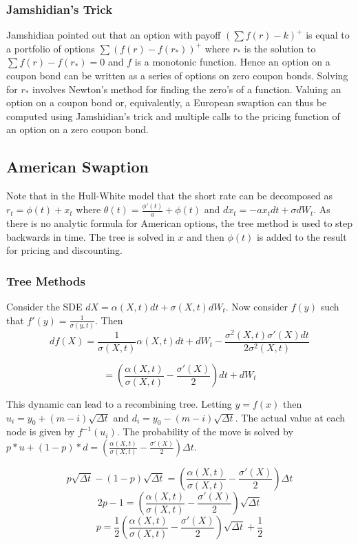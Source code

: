 \documentclass{article}
\theoremstyle{definition}
\begin{document}
\subsubsection{Jamshidian's Trick} \label{Jamshidian}

Jamshidian pointed out that an option with payoff \(\left(\sum f(r) -k\right)^+\) is equal to a portfolio of options \(\sum (f(r)-f(r_*))^+\) where \(r_*\) is the solution to \(\sum f(r)-f(r_*)=0\) and \(f\) is a monotonic function. Hence an option on a coupon bond can be written as a series of options on zero coupon bonds.   Solving for \(r_*\) involves Newton's method for finding the zero's of a function.  Valuing an option on a coupon bond or, equivalently, a European swaption can thus be computed using Jamshidian's trick and multiple calls to the pricing function of an option on a zero coupon bond.

\subsection{American Swaption}

Note that in the Hull-White model that the short rate can be decomposed as \(r_t=\phi(t)+x_t\) where \(\theta(t)=\frac{\phi'(t)}{a}+\phi(t)\) and \(dx_t=-ax_t dt+\sigma dW_t\).  As there is no analytic formula for American options, the tree method is used to step backwards in time.  The tree is solved in \(x\) and then \(\phi(t)\) is added to the result for pricing and discounting.

\subsubsection{Tree Methods} \label{tree}
Consider the SDE \(dX=\alpha(X, t)dt+\sigma(X, t)dW_t\).  Now consider \(f(y)\) such that \(f'(y)=\frac{1}{\sigma(y, t)}\).  Then \[df(X)=\frac{1}{\sigma(X, t)} \alpha(X, t)dt+dW_t-\frac{\sigma^2(X, t)\sigma'(X)dt}{2\sigma^2(X, t)}\]

\[=\left(\frac{\alpha(X, t)}{\sigma(X, t)}-\frac{\sigma'(X)}{2}\right)dt+dW_t\]

 This dynamic can lead to a recombining tree.  Letting \(y=f(x)\) then \(u_i=y_0+(m-i)\sqrt{\Delta t}\) and \(d_i=y_0-(m-i)\sqrt{\Delta t}\).  The actual value at each node is given by \(f^{-1}(u_i)\). The probability of the move is solved by \(p*u+(1-p)*d=\left(\frac{\alpha(X, t)}{\sigma(X, t)}-\frac{\sigma'(X)}{2}\right)\Delta t\).

 \[p\sqrt{\Delta t}-(1-p)\sqrt{\Delta t}=\left(\frac{\alpha(X, t)}{\sigma(X, t)}-\frac{\sigma'(X)}{2}\right)\Delta t\]
  \[2p-1=\left(\frac{\alpha(X, t)}{\sigma(X, t)}-\frac{\sigma'(X)}{2}\right)\sqrt{\Delta t}\]
  \[p=\frac{1}{2}\left(\frac{\alpha(X, t)}{\sigma(X, t)}-\frac{\sigma'(X)}{2}\right)\sqrt{\Delta t}+\frac{1}{2}\]
\end{document}
